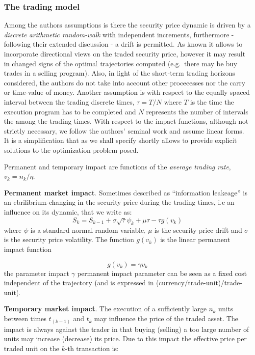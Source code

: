 \hypertarget{the-trading-model}{%
\subsubsection{The trading model}\label{the-trading-model}}

Among the authors assumptions is there the security price dynamic is
driven by a \emph{discrete arithmetic random-walk} with independent
increments, furthermore - following their extended discussion - a drift
is permitted. As known it allows to incorporate directional views on the
traded security price, however it may result in changed signs of the
optimal trajectories computed (e.g.~there may be buy trades in a selling
program). Also, in light of the short-term trading horizons considered,
the authors do not take into account other procecesses nor the carry or
time-value of money. Another assumption is with respect to the equally
spaced interval between the trading discrete times, \(\tau = T/N\) where
\(T\) is the time the execution program has to be completed and \(N\)
represents the number of intervals the among the trading times. With
respect to the impact functions, although not strictly necessary, we
follow the authors' seminal work and assume linear forms. It is a
simplification that as we shall specify shortly allows to provide
explicit solutions to the optimization problem posed.

Permanent and temporary impact are functions of the
\emph{average trading rate}, \(v_{k} = n_{k}/\eta\).

\textbf{Permanent market impact}. Sometimes described as ``information
leakeage'' is an ebrilibrium-changing in the security price during the
trading times, i.e an influence on its dynamic, that we write as:
\[ S_{k} = S_{k-1} + \sigma\sqrt{\tau}\psi_{k} + \mu\tau - \tau g(v_{k}) \]
where \(\psi\) is a standard normal random variable, \(\mu\) is the
security price drift and \(\sigma\) is the security price volatility.
The function \(g(v_{k})\) is the linear permanent impact function

\[ g(v_{k}) = \gamma v_{k} \] the parameter impact \(\gamma\) permanent
impact parameter can be seen as a fixed cost independent of the
trajectory (and is expressed in (currency/trade-unit)/trade-unit).

\textbf{Temporary market impact}. The execution of a sufficiently large
\(n_{k}\) units between times \(t_(k - 1)\) and \(t_k\) may influence
the price of the traded asset. The impact is always against the trader
in that buying (selling) a too large number of units may increase
(decrease) its price. Due to this impact the effective price per traded
unit on the \(k\)-th transaction is:

